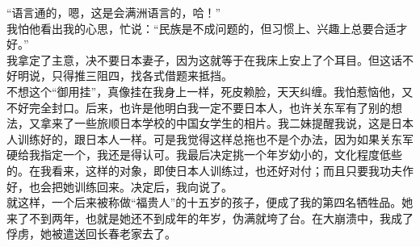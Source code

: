 “语言通的，嗯，这是会满洲语言的，哈！”\\

我怕他看出我的心思，忙说：“民族是不成问题的，但习惯上、兴趣上总要合适才好。”\\

我拿定了主意，决不要日本妻子，因为这就等于在我床上安上了个耳目。但这话不好明说，只得推三阻四，找各式借题来抵挡。\\

不想这个“御用挂”，真像挂在我身上一样，死皮赖脸，天天纠缠。我怕惹恼他，又不好完全封口。后来，也许是他明白我一定不要日本人，也许关东军有了别的想法，又拿来了一些旅顺日本学校的中国女学生的相片。我二妹提醒我说，这是日本人训练好的，跟日本人一样。可是我觉得这样总拖也不是个办法，因为如果关东军硬给我指定一个，我还是得认可。我最后决定挑一个年岁幼小的，文化程度低些的。在我看来，这样的对象，即使日本人训练过，也还好对付；而且只要我功夫作好，也会把她训练回来。决定后，我向说了。\\

就这样，一个后来被称做“福贵人”的十五岁的孩子，便成了我的第四名牺牲品。她来了不到两年，也就是她还不到成年的年岁，伪满就垮了台。在大崩溃中，我成了俘虏，她被遣送回长春老家去了。

